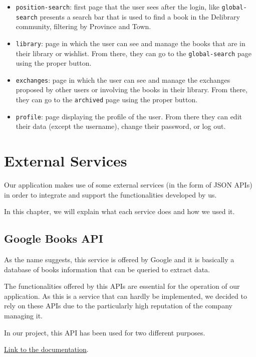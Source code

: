 \begin{itemize}
      \item \texttt{position-search}:
            first page that the user sees after the login, like \texttt{global-search} presents a search bar that is used to find a book
            in the Delibrary community, filtering by Province and Town.
      \item \texttt{library}:
            page in which the user can see and manage the books that are in their library or wishlist.
            From there, they can go to the \texttt{global-search} page using the proper button.
      \item \texttt{exchanges}:
            page in which the user can see and manage the exchanges proposed by other users or involving the books in their library.
            From there, they can go to the \texttt{archived} page using the proper button.
      \item \texttt{profile}:
            page displaying the profile of the user. From there they can edit their data (except the username), change their password, or log out.
\end{itemize}



\chapter{External Services}
Our application makes use of some external services (in the form of JSON APIs) in order to integrate and support the functionalities developed by us.

In this chapter, we will explain what each service does and how we used it.

\section{Google Books API}
As the name suggests, this service is offered by Google and it is basically a database of books information that can be queried to extract data.

The functionalities offered by this APIs are essential for the operation of our application. 
As this is a service that can hardly be implemented, we decided to rely on these APIs due to the particularly high reputation of the company managing it.

In our project, this API has been used for two different purposes. 

\underline{\href{https://developers.google.com/books}{Link to the documentation}}.

